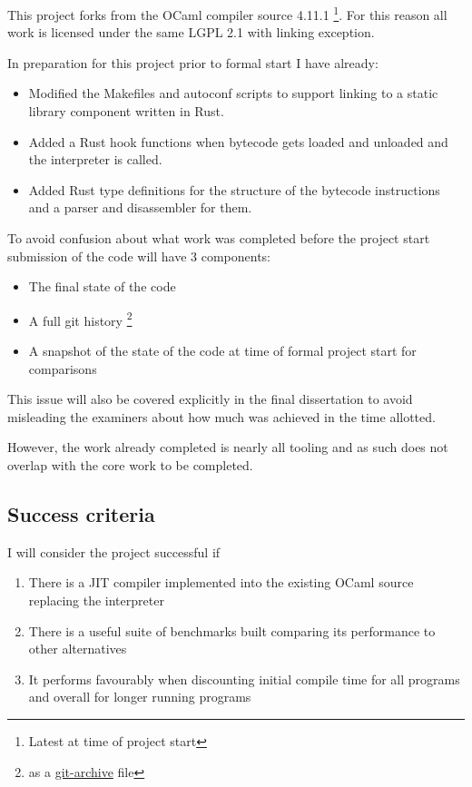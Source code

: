 \documentclass[12pt,a4paper, headings=standardclasses]{scrartcl}
\begin{document}
This project forks from the OCaml compiler source 4.11.1 \footnote{Latest at
    time of project start}. For this reason all work is licensed under the same
LGPL 2.1 with linking exception.

In preparation for this project prior to formal start I have already:

\begin{itemize}
    \item Modified the Makefiles and autoconf scripts to support linking to
          a static library component written in Rust.
    \item Added a Rust hook functions when bytecode gets loaded and unloaded
          and the interpreter is called.
    \item Added Rust type definitions for the structure of the bytecode instructions
          and a parser and disassembler for them.
\end{itemize}

To avoid confusion about what work was completed before the project start
submission of the code will have 3 components:

\begin{itemize}
    \item The final state of the code
    \item A full git history \footnote{as a \href{https://git-scm.com/docs/git-archive}{git-archive} file}
    \item A snapshot of the state of the code at time of formal project start for comparisons
\end{itemize}

This issue will also be covered explicitly in the final dissertation to avoid
misleading the examiners about how much was achieved in the time allotted.

However, the work already completed is nearly all tooling and as such does
not overlap with the core work to be completed.

\subsection*{Success criteria}

I will consider the project successful if

\begin{enumerate}
    \item There is a JIT compiler implemented into the existing OCaml source
          replacing the interpreter
    \item There is a useful suite of benchmarks built comparing its
          performance to other alternatives
    \item It performs favourably when discounting initial compile time for all programs
          and overall for longer running programs
\end{enumerate}
\end{document}
